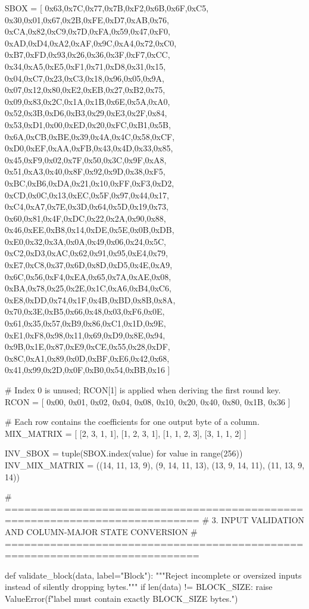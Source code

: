 \begin{lightcode}[numbers=left,firstnumber=1]
SBOX = [
    0x63,0x7C,0x77,0x7B,0xF2,0x6B,0x6F,0xC5,
    0x30,0x01,0x67,0x2B,0xFE,0xD7,0xAB,0x76,
    0xCA,0x82,0xC9,0x7D,0xFA,0x59,0x47,0xF0,
    0xAD,0xD4,0xA2,0xAF,0x9C,0xA4,0x72,0xC0,
    0xB7,0xFD,0x93,0x26,0x36,0x3F,0xF7,0xCC,
    0x34,0xA5,0xE5,0xF1,0x71,0xD8,0x31,0x15,
    0x04,0xC7,0x23,0xC3,0x18,0x96,0x05,0x9A,
    0x07,0x12,0x80,0xE2,0xEB,0x27,0xB2,0x75,
    0x09,0x83,0x2C,0x1A,0x1B,0x6E,0x5A,0xA0,
    0x52,0x3B,0xD6,0xB3,0x29,0xE3,0x2F,0x84,
    0x53,0xD1,0x00,0xED,0x20,0xFC,0xB1,0x5B,
    0x6A,0xCB,0xBE,0x39,0x4A,0x4C,0x58,0xCF,
    0xD0,0xEF,0xAA,0xFB,0x43,0x4D,0x33,0x85,
    0x45,0xF9,0x02,0x7F,0x50,0x3C,0x9F,0xA8,
    0x51,0xA3,0x40,0x8F,0x92,0x9D,0x38,0xF5,
    0xBC,0xB6,0xDA,0x21,0x10,0xFF,0xF3,0xD2,
    0xCD,0x0C,0x13,0xEC,0x5F,0x97,0x44,0x17,
    0xC4,0xA7,0x7E,0x3D,0x64,0x5D,0x19,0x73,
    0x60,0x81,0x4F,0xDC,0x22,0x2A,0x90,0x88,
    0x46,0xEE,0xB8,0x14,0xDE,0x5E,0x0B,0xDB,
    0xE0,0x32,0x3A,0x0A,0x49,0x06,0x24,0x5C,
    0xC2,0xD3,0xAC,0x62,0x91,0x95,0xE4,0x79,
    0xE7,0xC8,0x37,0x6D,0x8D,0xD5,0x4E,0xA9,
    0x6C,0x56,0xF4,0xEA,0x65,0x7A,0xAE,0x08,
    0xBA,0x78,0x25,0x2E,0x1C,0xA6,0xB4,0xC6,
    0xE8,0xDD,0x74,0x1F,0x4B,0xBD,0x8B,0x8A,
    0x70,0x3E,0xB5,0x66,0x48,0x03,0xF6,0x0E,
    0x61,0x35,0x57,0xB9,0x86,0xC1,0x1D,0x9E,
    0xE1,0xF8,0x98,0x11,0x69,0xD9,0x8E,0x94,
    0x9B,0x1E,0x87,0xE9,0xCE,0x55,0x28,0xDF,
    0x8C,0xA1,0x89,0x0D,0xBF,0xE6,0x42,0x68,
    0x41,0x99,0x2D,0x0F,0xB0,0x54,0xBB,0x16
]


# Index 0 is unused; RCON[1] is applied when deriving the first round key.
RCON = [
    0x00, 0x01, 0x02, 0x04, 0x08,
    0x10, 0x20, 0x40, 0x80, 0x1B, 0x36
]


# Each row contains the coefficients for one output byte of a column.
MIX_MATRIX = [
    [2, 3, 1, 1],
    [1, 2, 3, 1],
    [1, 1, 2, 3],
    [3, 1, 1, 2]
]

INV_SBOX = tuple(SBOX.index(value) for value in range(256))
INV_MIX_MATRIX = ((14, 11, 13, 9), (9, 14, 11, 13), (13, 9, 14, 11), (11, 13, 9, 14))


# ============================================================================
# 3. INPUT VALIDATION AND COLUMN-MAJOR STATE CONVERSION
# ============================================================================


def validate_block(data, label="Block"):
    """Reject incomplete or oversized inputs instead of silently dropping bytes."""
    if len(data) != BLOCK_SIZE:
        raise ValueError(f"{label} must contain exactly {BLOCK_SIZE} bytes.")



\end{lightcode}
